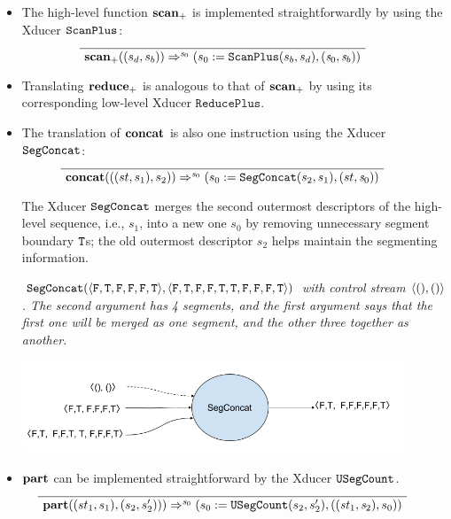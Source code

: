 \begin{itemize}
\item The high-level function $\mathbf{scan}_+$ is implemented straightforwardly by using the  Xducer $\mathtt{ScanPlus}_{}$:
	$$	\PT{
	\Axiom{\Transf{\*{scan}_+}{(s_d,s_b)}{\s_0}{}{\sfun{\sdef{s_0}{\scanf{s_b}{s_d}}} {(\s_0,\s_b)}}}
}$$

\item Translating $\mathbf{reduce}_+$ is analogous to that of $\mathbf{scan}_+$ by using its corresponding low-level Xducer $\mathtt{ReducePlus}$.

\item The translation of $\mathbf{concat}$ is also one instruction using the Xducer $\mathtt{SegConcat}$:
$$	\PT{
	\Axiom{\Transf{\*{concat}}{((st,s_1),s_2)}{\s_0}{}{\sfun{\sdef{s_0}{\segconcat(s_2,s_1)}} {(st,\s_0)}}}
}$$


The Xducer $\mathtt{SegConcat}$ merges the second outermost descriptors of the high-level sequence, i.e., $s_1$, into a new one $s_0$ by removing unnecessary segment boundary $\mathtt{T}$s; the old outermost descriptor $s_2$ helps maintain the segmenting information.

\begin{example} \emph{$\segconcat(\<\F,\T,\F,\F,\F,\T\'>,\< \F,\T, \F,\F,\T,\T, \F,\F, \F,\T \'>)$ with control stream $\<(),()\'>$. The second argument has 4 segments, and the first argument says that the first one will be merged as one segment, and the other three together as another.}\\
	\begin{center}
		\includegraphics[width=0.9\textwidth]{fig/segconcat.png}
	\end{center}
\end{example}


\item $\mathbf{part}$ can be implemented straightforward by the Xducer $\mathtt{USegCount}$.
$$	\PT{
	\Axiom{\Transf{\*{part}}{(st_1,s_1),(s_2,s_2'))}{\s_0}{}{\sfun{\sdef{s_0}{\usegcount(s_2,s_2')}} {((\st_1,\s_2),s_0)}}}
}$$


\end{itemize}
